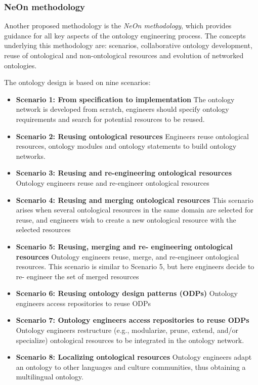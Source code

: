 \subsubsection{NeOn methodology}
Another proposed methodology is the \textit{NeOn methodology}\cite{neon1,neon2}, which provides guidance for all key aspects of the ontology engineering process.
The concepts underlying this methodology are: scenarios, collaborative ontology development, reuse of ontological and non-ontological resources and evolution of networked ontologies. 

The ontology design is based on nine scenarios:
\begin{itemize}
    \item \textbf{Scenario 1: From specification to implementation} The ontology network is developed from scratch, engineers should specify ontology requirements and search for potential resources to be reused. 

    \item \textbf{Scenario 2: Reusing ontological resources} Engineers reuse ontological resources, ontology modules and ontology statements to build ontology networks. 

    \item \textbf{Scenario 3: Reusing and re-engineering ontological resources} Ontology engineers reuse and re-engineer ontological resources

    \item \textbf{Scenario 4: Reusing and merging ontological resources} This scenario arises when several ontological resources in the same domain are selected for reuse, and engineers wish to create a new ontological resource with the selected resources

    \item \textbf{Scenario 5: Reusing, merging and re- engineering ontological resources} Ontology engineers reuse, merge, and re-engineer ontological resources. This scenario is similar to Scenario 5, but here engineers decide to re- engineer the set of merged resources

    \item  \textbf{Scenario 6: Reusing ontology design patterns (ODPs)} Ontology engineers access repositories to reuse ODPs

    \item \textbf{Scenario 7: Ontology engineers access repositories to reuse ODPs} Ontology engineers restructure (e.g., modularize, prune, extend, and/or specialize) ontological resources to be  integrated in the ontology network. 

    \item \textbf{Scenario 8: Localizing ontological resources} Ontology engineers adapt an ontology to other languages and culture communities, thus obtaining a multilingual ontology.

\end{itemize}
